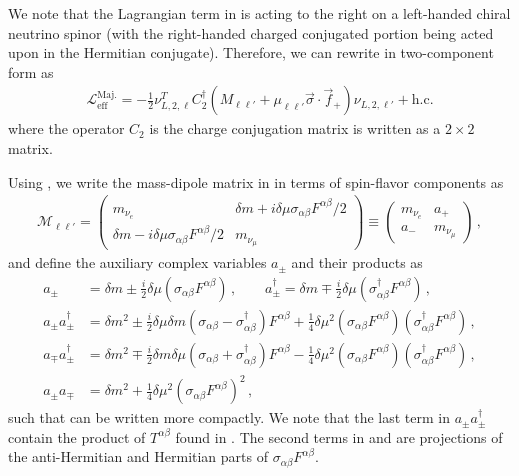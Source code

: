 We note that the Lagrangian term in  is acting to the right on a left-handed chiral neutrino spinor (with the right-handed charged conjugated portion being acted upon in the Hermitian conjugate). Therefore, we can rewrite  in two-component form as
\begin{align}
    \label{massmom:1a}
    \mathcal{L}_\mathrm{eff}^\mathrm{Maj.} = 
    -\frac{1}{2}\nu_{L,2,\ell}^{T}C_{2}^{\dag}\left(M_{\ell\ell'}+\mu_{\ell\ell'}\vec{\sigma}\cdot\vec{f}_{+}\right)\nu_{L,2,\ell'}+\mathrm{h.c.}
\end{align}
where the operator $C_{2}$ is the charge conjugation matrix is written as a $2\times 2$ matrix.




Using , we write the mass-dipole matrix in  in terms of spin-flavor components as
\begin{align}
	\label{mix:2a}
    \mathcal{M}_{\ell\ell'} = 
	\begin{pmatrix}
		m_{\nu_{e}} & {\delta m}+i\delta\mu\sigma_{\alpha\beta}F^{\alpha\beta}/2\\
		{\delta m}-i\delta\mu\sigma_{\alpha\beta}F^{\alpha\beta}/2 & m_{\nu_{\mu}}
	\end{pmatrix}\equiv
    \begin{pmatrix}
        m_{\nu_{e}} & a_{+}\\
        a_{-} & m_{\nu_{\mu}}
    \end{pmatrix}\,,
\end{align}
and define the auxiliary complex variables $a_{\pm}$ and their products as
\begin{align}
    \label{mix:2b}
    a_{\pm}&={\delta m}\pm \frac{i}{2}\delta\mu(\sigma_{\alpha\beta}F^{\alpha\beta})\,,\qquad
    a_{\pm}^{\dag}={\delta m}\mp\frac{i}{2}\delta\mu(\sigma_{\alpha\beta}^{\dag}F^{\alpha\beta})\,,\\
    \label{mix:2c}
    a_{\pm}a_{\pm}^{\dag}&=\delta m^{2}\pm
    \frac{i}{2}\delta\mu\delta m\left(\sigma_{\alpha\beta}-\sigma_{\alpha\beta}^{\dag}\right)F^{\alpha\beta}+
    \frac{1}{4}\delta\mu^{2}(\sigma_{\alpha\beta}F^{\alpha\beta})(\sigma_{\alpha\beta}^{\dag}F^{\alpha\beta})\,,\\
    \label{mix:2d}
    a_{\mp}a_{\pm}^{\dag}&=\delta m^{2}\mp\frac{i}{2}\delta m\delta\mu\left(\sigma_{\alpha\beta}+\sigma_{\alpha\beta}^{\dag}\right)F^{\alpha\beta}-\frac{1}{4}\delta\mu^{2}(\sigma_{\alpha\beta}F^{\alpha\beta})(\sigma_{\alpha\beta}^{\dag}F^{\alpha\beta})\,,\\
    \label{mix:2e}
    a_{\pm}a_{\mp}&=\delta m^{2} + \frac{1}{4}\delta\mu^{2}(\sigma_{\alpha\beta}F^{\alpha\beta})^{2}\,,
\end{align}
such that  can be written more compactly. We note that the last term in $a_{\pm}a_{\pm}^{\dag}$ contain the product of $T^{\alpha\beta}$ found in . The second terms in  and  are projections of the anti-Hermitian and Hermitian parts of $\sigma_{\alpha\beta}F^{\alpha\beta}$.

